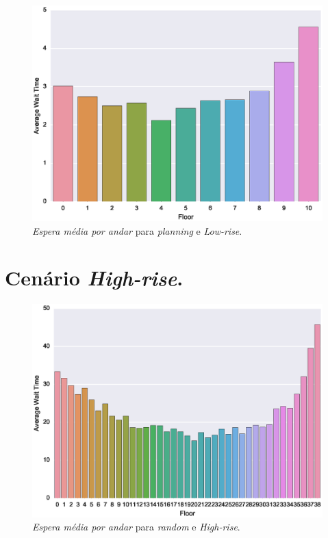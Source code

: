 \begin{figure}[H]
  \centering
  \includegraphics[scale=0.8]{img/results/Low-rise/5_Planning_Random/averageWaitTime}
  \caption{\textit{Espera média por andar} para \textit{planning} e \textit{Low-rise}.}
  \label{fig:result:low-rise:avgwt:planning}
\end{figure}

\section{Cenário \textit{High-rise}.}

\begin{figure}[H]
  \centering
  \includegraphics[scale=0.8]{img/results/High-rise/1_Simple_Random/averageWaitTime}
  \caption{\textit{Espera média por andar} para \textit{random} e \textit{High-rise}.}
  \label{fig:result:high-rise:avgwt:random}
\end{figure}

